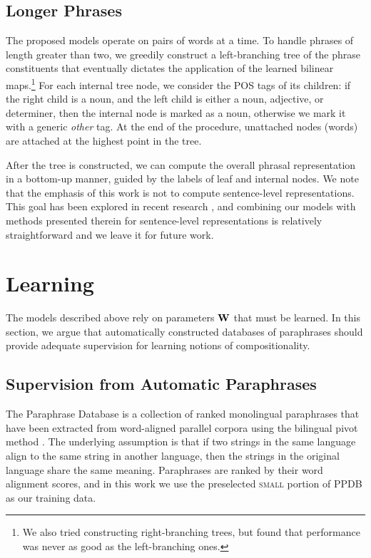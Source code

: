 \documentclass[11pt,letterpaper]{article}
\newcommand{\bW}{{\bf W}}
\begin{document}
\subsection{Longer Phrases}
\label{sec:longer-phrases}

The proposed models operate on pairs of words at a time. 
To handle phrases of length greater than two, we greedily construct a left-branching tree of the phrase constituents that eventually dictates the application of the learned bilinear maps.\footnote{We also tried constructing right-branching trees, but found that performance was never as good as the left-branching ones.}
For each internal tree node, we consider the POS tags of its children: if the right child is a noun, and the left child is either a noun, adjective, or determiner, then the internal node is marked as a noun, otherwise we mark it with a generic \emph{other} tag. 
At the end of the procedure, unattached nodes (words) are attached at the highest point in the tree. 

After the tree is constructed, we can compute the overall phrasal representation in a bottom-up manner, guided by the labels of leaf and internal nodes.
We note that the emphasis of this work is not to compute sentence-level representations. 
This goal has been explored in recent research \cite{Le2014,Kalchbrenner2014}, and combining our models with methods presented therein for sentence-level representations is relatively straightforward and we leave it for future work. 

\section{Learning}
\label{sec:regularization}
The models described above rely on parameters $\bW$ that must be learned. 
In this section, we argue that automatically constructed databases of paraphrases should provide adequate supervision for learning notions of compositionality. 

\subsection{Supervision from Automatic Paraphrases}
\label{sec:ppdb}

The Paraphrase Database \cite[PPDB]{Ganitkevich2013} is a collection of ranked monolingual paraphrases that have been extracted from word-aligned parallel corpora using the bilingual pivot method \cite{Bannard2005}. 
The underlying assumption is that if two strings in the same language align to the same string in another language, then the strings in the original language share the same meaning. 
Paraphrases are ranked by their word alignment scores, and in this work we use the preselected \textsc{small} portion of PPDB as our training data.%
\end{document}

